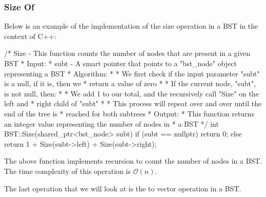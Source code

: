 \begin{highlight}

\subsubsection*{Size Of}

Below is an example of the implementation of the size operation in a BST in the context of C++:

\begin{code}
/*  Size - This function counts the number of nodes that are present in a given BST
*   Input:
*     subt - A smart pointer that points to a "bst_node" object representing a BST
*   Algorithm:
*     * We first check if the input parameter "subt" is a null, if it is, then we 
*       return a value of zero
*     * If the current node, "subt", is not null, then:
*       * We add 1 to our total, and the recursively call "Size" on the left and 
*         right child of "subt"
*       * This process will repeat over and over until the end of the tree is 
*         reached for both subtrees
*   Output:
*     This function returns an integer value representing the number of nodes in 
*     a BST
*/
int BST::Size(shared_ptr<bst_node> subt){
    if (subt == nullptr) {
        return 0;
    }
    else {
        return 1 + Size(subt->left) + Size(subt->right);
    }
}
\end{code}

\noindent The above function implements recursion to count the number of nodes in a BST. The time complexity of this operation is $\mathcal{O}(n)$.

\end{highlight}

The last operation that we will look at is the to vector operation in a BST.

